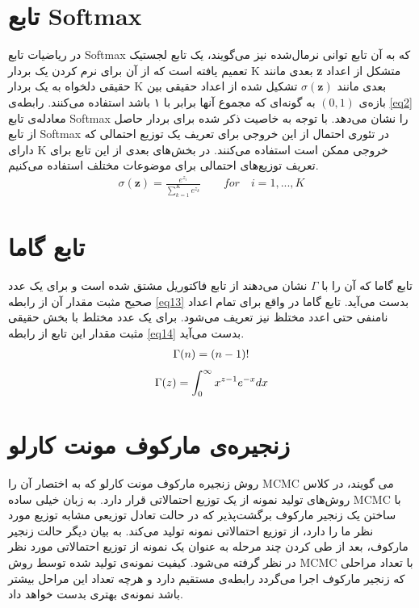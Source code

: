 \section{تابع Softmax}
\label{chap2sec9}
در ریاضیات تابع
Softmax
که به آن تابع توانی‌ نرمال‌شده
 نیز می‌‌گویند، یک تابع لجستیک تعمیم یافته است که از آن برای نرم کردن یک بردار
K
بعدی مانند
\textbf{z}
متشکل از اعداد حقیقی‌ دلخواه به یک بردار
K
بعدی مانند
$\sigma(\textbf{z})$ 
تشکیل شده از اعداد حقیقی‌ بین بازه‌ی
$(0,1)$
به گونه‌ای که مجموع آنها برابر با ۱ باشد استفاده می‌‌کنند. رابطه‌ی
\ref{eq2}
معادله‌ی تابع
Softmax
را نشان می‌‌دهد. با توجه به خاصیت ذکر شده برای بردار حاصل از تابع
Softmax
در تئوری احتمال از این خروجی برای تعریف یک توزیع احتمالی که دارای
K
خروجی ممکن است استفاده می‌کنند. در بخش‌های بعدی از این تابع برای تعریف توزیع‌های احتمالی‌ برای موضوعات مختلف استفاده می‌‌کنیم.
\begin{align}
\sigma(\textbf{z}) = \frac{e^{z_i}}{\sum_{k=1}^{K}e^{z_k}} \quad\quad for\quad i = 1, ..., K
\label{eq2}
\end{align}

\section{تابع گاما}
\label{chap2sec8}
تابع گاما
 که آن را با
$\Gamma$
نشان می‌‌دهند از تابع فاکتوریل مشتق شده است و برای یک عدد صحیح مثبت مقدار آن از رابطه
\ref{eq13}
بدست می‌‌آید. تابع گاما در واقع برای تمام اعداد نامنفی حتی اعدد مختلظ نیز تعریف می‌‌شود. برای یک عدد مختلط با بخش حقیقی مثبت مقدار این تابع از رابطه
\ref{eq14}
بدست می‌‌آید.
\begin{align}
\centering
\label{eq13}
	\Gamma(n) = (n-1)!
\end{align}
\begin{align}
\centering
\label{eq14}
	\Gamma(z) = \int_{0}^{\infty} x^{z-1}e^{-x}dx
\end{align}



\section{زنجیره‌ی مارکوف مونت کارلو}
\label{chap2sec6}
روش زنجیره‌ مارکوف مونت کارلو
 که به اختصار آن را
MCMC
می‌ گویند، در کلاس روش‌های تولید نمونه از یک توزیع احتمالاتی قرار دارد. به زبان خیلی‌ ساده
MCMC
با ساختن یک زنجیر مارکوف برگشت‌پذیر
که در حالت تعادل توزیعی مشابه توزیع مورد نظر ما را دارد، از توزیع احتمالاتی نمونه تولید می‌‌کند. به بیان دیگر حالت زنجیر مارکوف، بعد از طی‌ کردن چند مرحله به عنوان یک نمونه از توزیع احتمالاتی مورد نظر در نظر گرفته می‌شود. کیفیت نمونه‌‌ی تولید شده توسط روش
MCMC
با تعداد مراحلی که زنجیر مارکوف اجرا می‌‌گردد رابطه‌ی مستقیم دارد و هرچه تعداد این مراحل بیشتر باشد نمونه‌ی بهتری بدست خواهد داد.

